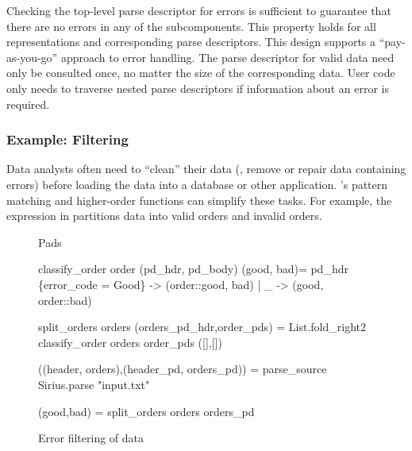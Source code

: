 \documentclass{sigplanconf}
\begin{document}
Checking the top-level parse descriptor for errors is sufficient to
guarantee that there are no errors in any of the subcomponents.  This
property holds for all representations and corresponding parse
descriptors.  This design supports a ``pay-as-you-go'' approach to
error handling. The parse descriptor for valid data need only be
consulted once, no matter the size of the corresponding data. User
code only needs to traverse nested parse descriptors if information
about an error is required.

\subsubsection{Example: Filtering}
\label{sec:ex-filter}

Data analysts often need to ``clean'' their data (\ie{}, remove or
repair data containing errors) before loading the data into a database
or other application.  \ocaml{}'s pattern matching and higher-order
functions can simplify these tasks.  For example, the expression in
 partitions \dibbler{} data into valid
orders and invalid orders.  

\begin{figure}
\begin{code}\scriptsize
{} Pads

 classify_order order (pd\_hdr, pd\_body) (good, bad)=
    pd\_hdr 
    \{error_code = Good\} -> (order::good, bad)
   | _                  -> (good, order::bad)

 split_orders orders (orders_pd_hdr,order_pds) = 
   List.fold_right2 classify_order orders order_pds ([],[])

 ((header, orders),(header_pd, orders_pd)) = 
   parse_source Sirius.parse "input.txt"

 (good,bad) = split_orders orders orders_pd\end{code} 
\caption{Error filtering of \dibbler{} data}
\label{fig:ex-data-clean}
\end{figure}
\end{document}
